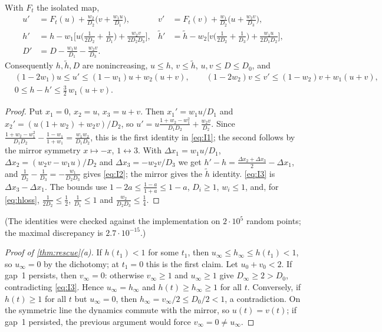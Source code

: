 \begin{lemma}[identities]\label{lem:id}
With $F_t$ the isolated map,
\begin{align}
u'&=F_t(u)+\frac{w_2}{D_2}\Big(v+\frac{w_1u}{D_1}\Big), &
v'&=F_t(v)+\frac{w_1}{D_2}\Big(u+\frac{w_2v}{D_3}\Big),\label{eq:I1}\\
h'&=h-w_1\Big[u\Big(\frac1{2D_2}+\frac1{D_1}\Big)+\frac{w_2v}{2D_2D_3}\Big], &
\tilde h'&=\tilde h-w_2\Big[v\Big(\frac1{2D_2}+\frac1{D_3}\Big)+\frac{w_1u}{2D_1D_2}\Big],\label{eq:I2}\\
D'&=D-\frac{w_1u}{D_1}-\frac{w_2v}{D_3}. \label{eq:I3}
\end{align}
Consequently $h,\tilde h,D$ are nonincreasing, $u\le h$, $v\le\tilde h$, $u,v\le D\le D_0$, and
\begin{align}
&(1-2w_1)u\le u'\le(1-w_1)u+w_2(u+v),\qquad (1-2w_2)v\le v'\le(1-w_2)v+w_1(u+v),\label{eq:bounds}\\
&0\le h-h'\le\tfrac32\,w_1(u+v). \label{eq:hloss}
\end{align}
\end{lemma}
\begin{proof}
Put $x_1=0$, $x_2=u$, $x_3=u+v$. Then $x_1'=w_1u/D_1$ and $x_2'=(u(1+w_2)+w_2v)/D_2$, so
$u'=u\frac{1+w_2-w_1^2}{D_1D_2}+\frac{w_2v}{D_2}$. Since $\frac{1+w_2-w_1^2}{D_1D_2}-\frac{1-w_1}{1+w_1}=\frac{w_1w_2}{D_1D_2}$, this is the first
identity in \eqref{eq:I1}; the second follows by the mirror symmetry $x\mapsto-x$, $1\leftrightarrow3$. With $\Delta x_1=w_1u/D_1$,
$\Delta x_2=(w_2v-w_1u)/D_2$ and $\Delta x_3=-w_2v/D_3$ we get $h'-h=\frac{\Delta x_2+\Delta x_3}2-\Delta x_1$, and
$\frac1{D_2}-\frac1{D_3}=-\frac{w_1}{D_2D_3}$ gives \eqref{eq:I2}; the mirror gives the $\tilde h$ identity. \eqref{eq:I3} is
$\Delta x_3-\Delta x_1$. The bounds use $1-2a\le\frac{1-a}{1+a}\le1-a$, $D_i\ge1$, $w_i\le1$, and, for \eqref{eq:hloss},
$\frac1{2D_2}\le\frac12$, $\frac1{D_1}\le1$ and $\frac{w_2}{D_2D_3}\le\frac14$.
\end{proof}
(The identities were checked against the implementation on $2\cdot10^5$ random points; the maximal discrepancy is $2.7\cdot10^{-15}$.)

\begin{proof}[Proof of \cref{thm:rescue}(a)]
If $h(t_1)<1$ for some $t_1$, then $u_\infty\le h_\infty\le h(t_1)<1$, so $u_\infty=0$ by the dichotomy; at $t_1=0$ this is the first claim.
Let $u_0+v_0<2$. If gap~1 persists, then $v_\infty=0$: otherwise $v_\infty\ge1$ and $u_\infty\ge1$ give $D_\infty\ge2>D_0$, contradicting
\eqref{eq:I3}. Hence $u_\infty=h_\infty$ and $h(t)\ge h_\infty\ge1$ for all $t$. Conversely, if $h(t)\ge1$ for all $t$ but $u_\infty=0$, then
$h_\infty=v_\infty/2\le D_0/2<1$, a contradiction. On the symmetric line the dynamics commute with the mirror, so $u(t)=v(t)$; if gap~1
persisted, the previous argument would force $v_\infty=0\ne u_\infty$.
\end{proof}

